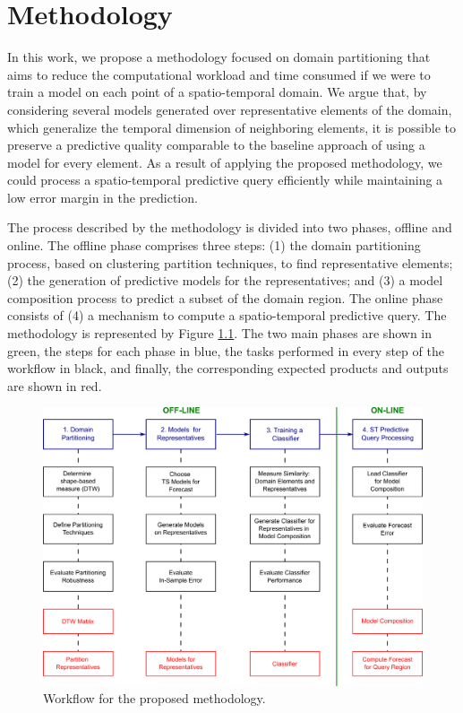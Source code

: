 \chapter[Methodology]{Methodology}
\label{Chapter:Methodology}

In this work, we propose a methodology focused on domain partitioning that aims to reduce the computational workload and time consumed if we were to train a model on each point of a spatio-temporal domain. We argue that, by considering several models generated over representative elements of the domain, which generalize the temporal dimension of neighboring elements, it is possible to preserve a predictive quality comparable to the baseline approach of using a model for every element. As a result of applying the proposed methodology, we could process a spatio-temporal predictive query efficiently while maintaining a low error margin in the prediction.

The process described by the methodology is divided into two phases, offline and online. The offline phase comprises three steps: (1) the domain partitioning process, based on clustering partition techniques, to find representative elements; (2) the generation of predictive models for the representatives; and (3) a model composition process to predict a subset of the domain region. The online phase consists of (4) a mechanism to compute a spatio-temporal predictive query. The methodology is represented by Figure \ref{Fig:OverviewMethodology}. The two main phases are shown in green, the steps for each phase in blue, the tasks performed in every step of the workflow in black, and finally, the corresponding expected products and outputs are shown in red. 

\begin{figure}[h]
	\centering
	\includegraphics[scale=0.16]{../Figures/Methodology_Complete}
	\caption{Workflow for the proposed methodology.}
	\label{Fig:OverviewMethodology}
\end{figure}

